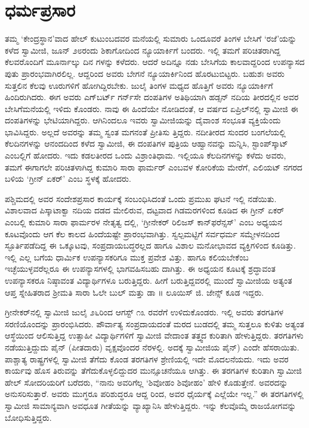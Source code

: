 
\chapter{ಧರ್ಮಪ್ರಸಾರ}

\noindent

ತಮ್ಮ ‘ಕೇಂದ್ರಸ್ಥಾನ’ವಾದ ಹೇಲ್ ಕುಟುಂಬದವರ ಮನೆಯಲ್ಲಿ ಸುಮಾರು ಒಂದೂವರೆ ತಿಂಗಳ ಬೇಸಿಗೆ ‘ರಜೆ’ಯನ್ನು ಕಳೆದ ಸ್ವಾಮೀಜಿ, ಜೂನ್ ೨೮ರಂದು ಶಿಕಾಗೋದಿಂದ ನ್ಯೂಯಾರ್ಕಿಗೆ ಬಂದರು. ಇಲ್ಲಿ ತಮಗೆ ಪರಿಚಿತರಾಗಿದ್ದ ಕೆಲವರೊಂದಿಗೆ ಮೂರ್ನಾಲ್ಕು ದಿನ ಗಳನ್ನು ಕಳೆದರು. ಆದರೆ ಅದಿನ್ನೂ ನಡು ಬೇಸಿಗೆಯ ಕಾಲವಾದ್ದರಿಂದ ಉಪನ್ಯಾಸದ ಪುತು ಪ್ರಾರಂಭವಾಗಿರಲಿಲ್ಲ. ಆದ್ದರಿಂದ ಅವರು ಬೇಗನೆ ನ್ಯೂಯಾರ್ಕಿನಿಂದ ಹೊರಟುಬಿಟ್ಟರು. ಬಹುಶಃ ಅವರು ಸುತ್ತಲಿನ ಕೆಲವು ಊರುಗಳಿಗೆ ಹೋಗಿದ್ದಿರಬೇಕು. ಜುಲೈ ತಿಂಗಳ ಮಧ್ಯದ ಹೊತ್ತಿಗೆ ಅವರು ನ್ಯೂಯಾರ್ಕಿಗೆ ಹಿಂದಿರುಗಿದರು. ಈಗ ಅವರು ಎಗ್​ಬರ್ಟ್ ಗರ್ನ್​ಸೇ ದಂಪತಿಗಳ ಅತಿಥಿಯಾಗಿ ಹಡ್ಸನ್ ನದಿಯ ತೀರದಲ್ಲಿನ ಅವರ ಬೇಸಿಗೆಮನೆಯಲ್ಲಿ ಇಳಿದು ಕೊಂಡರು. ನಾವು ಈ ಹಿಂದೆಯೇ ನೋಡಿದಂತೆ, ಆ ವರ್ಷದ ಏಪ್ರಿಲ್​ನಲ್ಲಿ ಸ್ವಾಮೀಜಿ ಈ ದಂಪತಿಗಳನ್ನು ಭೇಟಿಯಾಗಿದ್ದರು. ಆಗಿನಿಂದಲೂ ಇವರು ಸ್ವಾಮೀಜಿಯನ್ನು ದೈವಾಂಶ ಸಂಭೂತ ವ್ಯಕ್ತಿಯೆಂದು ಭಾವಿಸಿದ್ದರು. ಅಲ್ಲದೆ ಅವರನ್ನು ತಮ್ಮ ಸ್ವಂತ ಮಗನಂತೆ ಪ್ರೀತಿಸು ತ್ತಿದ್ದರು. ನದೀತೀರದ ಸುಂದರ ಬಂಗಲೆಯಲ್ಲಿ ಕೆಲದಿನಗಳನ್ನು ಆನಂದದಿಂದ ಕಳೆದ ಸ್ವಾಮೀಜಿ, ಈ ದಂಪತಿಗಳ ಪುತ್ರಿಯ ಆಹ್ವಾನವನ್ನು ಮನ್ನಿಸಿ, ಸ್ಟಾಂಪ್​ಸ್ಕಾಟ್ ಎಂಬಲ್ಲಿಗೆ ಹೋದರು. ಇದು ಕಡಲತೀರದ ಒಂದು ವಿಶ್ರಾಂತಿಧಾಮ. ಇಲ್ಲಿಯೂ ಕೆಲದಿನಗಳನ್ನು ಕಳೆದು ಅವರು, ತಮಗೆ ಈಗಾಗಲೇ ಪರಿಚಿತಳಾಗಿದ್ದ ಕುಮಾರಿ ಸಾರಾ ಫಾರ್ಮರ್ ಎಂಬವಳ ಕೋರಿಕೆಯ ಮೇರೆಗೆ, ಎಲಿಯಟ್ ನಗರದ ಬಳಿಯ ‘ಗ್ರೀನ್ ಏಕರ್​’ ಎಂಬ ಸ್ಥಳಕ್ಕೆ ಹೋದರು.

ಪಶ್ಚಿಮದಲ್ಲಿ ಅವರ ಸಂದೇಶಪ್ರಸಾರ ಕಾರ್ಯಕ್ಕೆ ಸಂಬಂಧಿಸಿದಂತೆ ಒಂದು ಪ್ರಮುಖ ಘಟನೆ ಇಲ್ಲಿ ನಡೆಯಿತು. ವಿಶಾಲವಾದ ಪಿಸ್ಕಾಟಾಕ್ವಾ ನದಿಯ ದಡದ ಮೇಲಿರುವ, ದಟ್ಟವಾದ ಗಿಡಮರಗಳಿಂದ ಕೂಡಿದ ಈ ಗ್ರೀನ್ ಏಕರ್ ಎಂಬಲ್ಲಿ ಕುಮಾರಿ ಸಾರಾ ಫಾರ್ಮರಳ ನೇತೃತ್ವ ದಲ್ಲಿ, ‘ಗ್ರೀನೇಕರ್ ರಿಲಿಜಸ್ ಕಾನ್​ಫರೆನ್ಸಸ್​’ ಎಂಬ ಅಧ್ಯಯನ ಕೂಟವೊಂದು ಆಗ ಕೆಲ ಕಾಲದ ಹಿಂದೆಯಷ್ಟೇ ಪ್ರಾರಂಭವಾಗಿತ್ತು. ಸ್ವಲ್ಪಮಟ್ಟಿಗೆ ಸರ್ವಧರ್ಮ ಸಮ್ಮೇಳನದಿಂದ ಸ್ಫೂರ್ತಿಪಡೆದಿದ್ದ ಈ ಒಕ್ಕೂಟವು, ಸಂಪ್ರದಾಯಬದ್ಧರಲ್ಲದ ಹಾಗೂ ವಿಶಾಲ ಮನೋಭಾವದ ವ್ಯಕ್ತಿಗಳಿಂದ ಕೂಡಿತ್ತು. ಇಲ್ಲಿ ಎಲ್ಲ ಬಗೆಯ ಧಾರ್ಮಿಕ ಉಪನ್ಯಾಸಕರಿಗೂ ಮುಕ್ತ ಪ್ರವೇಶ ವಿತ್ತು. ಹಾಗೂ ಕಲಿಯಬೇಕೆಂಬ ಇಚ್ಛೆಯುಳ್ಳವರೆಲ್ಲರೂ ಈ ಉಪನ್ಯಾಸಗಳಲ್ಲಿ ಭಾಗವಹಿಸಬಹು ದಾಗಿತ್ತು. ಈ ಅಧ್ಯಯನ ಕೂಟಕ್ಕೆ ಶ್ರದ್ಧಾವಂತ ಉಪನ್ಯಾಸಕರೂ ನಿಷ್ಠಾವಂತ ವಿದ್ಯಾರ್ಥಿಗಳೂ ಬರುತ್ತಿದ್ದರು. ಹೀಗೆ ಬರುತ್ತಿದ್ದವರಲ್ಲಿ ಮುಂದೆ ಸ್ವಾಮೀಜಿಯ ಅತ್ಯಂತ ಆಪ್ತ ಸ್ನೇಹಿತರಾದ ಶ್ರೀಮತಿ ಸಾರಾ ಓಲೇ ಬುಲ್ ಮತ್ತು ಡಾ ॥ ಲೂಯಿಸ್ ಜಿ. ಜೇನ್ಸ್ ಕೂಡ ಇದ್ದರು.

ಗ್ರೀನೇಕರ್​ನಲ್ಲಿ ಸ್ವಾಮೀಜಿ ಜುಲೈ ೨೬ರಿಂದ ಆಗಸ್ಟ್ ೧೩ ರವರೆಗೆ ಉಳಿದುಕೊಂಡರು. ಇಲ್ಲಿ ಅವರು ತರಗತಿಗಳ ಸರಣಿಯೊಂದನ್ನು ಪ್ರಾರಂಭಿಸಿದರು. ಪೌರ್ವಾತ್ಯ ಸಂಪ್ರದಾಯದಂತೆ ಮರದ ಬುಡದಲ್ಲಿ ತಮ್ಮ ಸುತ್ತಲೂ ಕುಳಿತು ಅತ್ಯಂತ ಆಸ್ಥೆಯಿಂದ ಆಲಿಸುತ್ತಿದ್ದ ಉತ್ಸಾಹೀ ವಿದ್ಯಾರ್ಥಿಗಳಿಗೆ ಸ್ವಾಮೀಜಿ ವೇದಾಂತ ತತ್ತ್ವದ ಕುರಿತಾಗಿ ಹೇಳುತ್ತಿದ್ದರು. ತರಗತಿಗಳು ನಡೆಯುತ್ತಿದ್ದುದು ಪೈನ್ (ಪೀತದಾರು) ವೃಕ್ಷವೊಂದರ ನೆರಳಲ್ಲಿ. ಅದಕ್ಕೆ ಸ್ವಾಮೀಜಿಯ ಪೈನ್​) ಎಂದೇ ಹೆಸರಾಯಿತು. ಪಾಶ್ಚಾತ್ಯ ರಾಷ್ಟ್ರಗಳಲ್ಲಿ ಸ್ವಾಮೀಜಿ ತೆಗೆದು ಕೊಂಡ ತರಗತಿಗಳ ಶ್ರೇಣಿಯಲ್ಲಿ ಇದೇ ಮೊದಲನೆಯದು. ಇದು ಅವರ ಕಾರ್ಯವು ಹೊಸ ತಿರುವನ್ನು ತೆಗೆದುಕೊಳ್ಳಲಿದ್ದುದರ ಮುನ್ಸೂಚನೆಯೂ ಆಗಿತ್ತು. ಈ ತರಗತಿಗಳ ಕುರಿತಾಗಿ ಸ್ವಾಮೀಜಿ ಹೇಲ್ ಸೋದರಿಯರಿಗೆ ಬರೆದರು, “ನಾನು ಅವರಿಗೆಲ್ಲ ‘ಶಿವೋಹಂ ಶಿವೋಹಂ’ ಹೇಳಿ ಕೊಡುತ್ತೇನೆ. ಅವರದನ್ನು ಅನುಸರಿಸುತ್ತಾರೆ. ಅವರು ಮುಗ್ಧರೂ ಪರಿಶುದ್ಧರೂ ಆದ್ದ ರಿಂದ, ಅವರ ಧೈರ್ಯಕ್ಕೆ ಎಲ್ಲೆಯೇ ಇಲ್ಲ.” ಈ ತರಗತಿಗಳಲ್ಲಿ ಸ್ವಾಮೀಜಿ ಸಾಮಾನ್ಯವಾಗಿ ಅವಧೂತ ಗೀತೆಯನ್ನು ವ್ಯಾಖ್ಯಾನಿಸಿ ಹೇಳುತ್ತಿದ್ದರು. ಇನ್ನು ಕೆಲವೊಮ್ಮೆ ರಾಜಯೋಗವನ್ನು ಬೋಧಿಸುತ್ತಿದ್ದರು.

